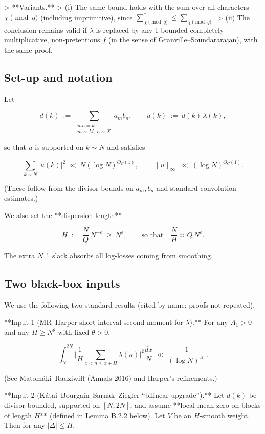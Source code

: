 \documentclass[11pt]{article}
\theoremstyle{definition}
\theoremstyle{remark}
\begin{document}
> **Variants.**
> (i) The same bound holds with the sum over all characters $\chi\pmod q$ (including imprimitive), since $\sum_{\chi\!\!\!\pmod q}^{\!*}\!\!\le \sum_{\chi\!\!\!\pmod q}$.
> (ii) The conclusion remains valid if $\lambda$ is replaced by any 1-bounded completely multiplicative, non-pretentious $f$ (in the sense of Granville–Soundararajan), with the same proof.


\subsection*{Set-up and notation}

Let

$$
d(k)\ :=\ \!\!\sum_{\substack{mn=k\\ m\sim M,\ n\sim X}}\!\! a_m b_n,\qquad 
u(k)\ :=\ d(k)\,\lambda(k),
$$

so that $u$ is supported on $k\sim N$ and satisfies

$$
\sum_{k\sim N} |u(k)|^2\ \ll\ N(\log N)^{O_C(1)},\qquad
\|u\|_\infty\ \ll\ (\log N)^{O_C(1)}.
$$

(These follow from the divisor bounds on $a_m,b_n$ and standard convolution estimates.)

We also set the **dispersion length**

$$
H\ :=\ \frac{N}{Q}\,N^{-\varepsilon}\ \ge\ N^{\varepsilon},\qquad
\text{so that}\quad \frac{N}{H}\asymp Q\,N^{\varepsilon}.
$$

The extra $N^{-\varepsilon}$ slack absorbs all log-losses coming from smoothing.

\subsection*{Two black-box inputs}

We use the following two standard results (cited by name; proofs not repeated).

**Input 1 (MR–Harper short-interval second moment for $\lambda$).**
For any $A_1>0$ and any $H\ge N^{\theta}$ with fixed $\theta>0$,

$$
\int_{N}^{2N}\Big|\frac{1}{H}\sum_{x<n\le x+H}\lambda(n)\Big|^2 \frac{dx}{N}
\ \ll\ \frac{1}{(\log N)^{A_1}}.
$$

(See Matomäki–Radziwiłł (Annals 2016) and Harper’s refinements.)

**Input 2 (Kátai–Bourgain–Sarnak–Ziegler “bilinear upgrade”).**
Let $d(k)$ be divisor-bounded, supported on $[N,2N]$, and assume **local mean-zero on blocks of length $H$** (defined in Lemma B.2.2 below). Let $V$ be an $H$-smooth weight. Then for any $|\Delta|\le H$,
\end{document}
